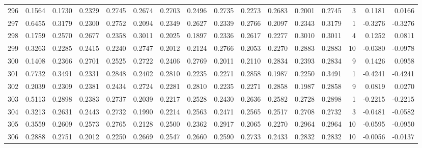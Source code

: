 \begin{tabular}{lrrrrrrrrrrrrrrr}
296 &      0.1564 &  0.1730 &  0.2329 &  0.2745 &  0.2674 &  0.2703 &  0.2496 &  0.2735 &  0.2273 &  0.2683 &   0.2001 &     0.2745 &      3 &                    0.1181 &                     0.0166 \\
297 &      0.6455 &  0.3179 &  0.2300 &  0.2752 &  0.2094 &  0.2349 &  0.2627 &  0.2339 &  0.2766 &  0.2097 &   0.2343 &     0.3179 &      1 &                   -0.3276 &                    -0.3276 \\
298 &      0.1759 &  0.2570 &  0.2677 &  0.2358 &  0.3011 &  0.2025 &  0.1897 &  0.2336 &  0.2617 &  0.2277 &   0.3010 &     0.3011 &      4 &                    0.1252 &                     0.0811 \\
299 &      0.3263 &  0.2285 &  0.2415 &  0.2240 &  0.2747 &  0.2012 &  0.2124 &  0.2766 &  0.2053 &  0.2270 &   0.2883 &     0.2883 &     10 &                   -0.0380 &                    -0.0978 \\
300 &      0.1408 &  0.2366 &  0.2701 &  0.2525 &  0.2722 &  0.2406 &  0.2769 &  0.2011 &  0.2110 &  0.2834 &   0.2393 &     0.2834 &      9 &                    0.1426 &                     0.0958 \\
301 &      0.7732 &  0.3491 &  0.2331 &  0.2848 &  0.2402 &  0.2810 &  0.2235 &  0.2271 &  0.2858 &  0.1987 &   0.2250 &     0.3491 &      1 &                   -0.4241 &                    -0.4241 \\
302 &      0.2039 &  0.2309 &  0.2381 &  0.2434 &  0.2724 &  0.2281 &  0.2810 &  0.2235 &  0.2271 &  0.2858 &   0.1987 &     0.2858 &      9 &                    0.0819 &                     0.0270 \\
303 &      0.5113 &  0.2898 &  0.2383 &  0.2737 &  0.2039 &  0.2217 &  0.2528 &  0.2430 &  0.2636 &  0.2582 &   0.2728 &     0.2898 &      1 &                   -0.2215 &                    -0.2215 \\
304 &      0.3213 &  0.2631 &  0.2443 &  0.2732 &  0.1990 &  0.2214 &  0.2563 &  0.2471 &  0.2565 &  0.2517 &   0.2708 &     0.2732 &      3 &                   -0.0481 &                    -0.0582 \\
305 &      0.3559 &  0.2609 &  0.2573 &  0.2765 &  0.2128 &  0.2500 &  0.2362 &  0.2917 &  0.2065 &  0.2270 &   0.2964 &     0.2964 &     10 &                   -0.0595 &                    -0.0950 \\
306 &      0.2888 &  0.2751 &  0.2012 &  0.2250 &  0.2669 &  0.2547 &  0.2660 &  0.2590 &  0.2733 &  0.2433 &   0.2832 &     0.2832 &     10 &                   -0.0056 &                    -0.0137 \\

\end{tabular}
